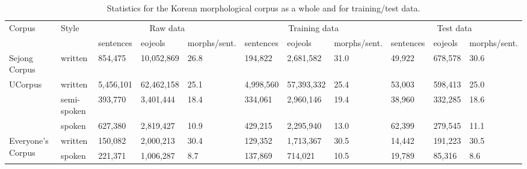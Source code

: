 \documentclass[AMS,STIX2COL]{WileyNJD-v2}
\begin{document}
    \begin{table}[ht]
        \centering
        \footnotesize
        \caption{Statistics for the Korean morphological corpus as a whole and for training/test data.}
        \label{tab:data-statistics}
        \begin{tabular}{m{20mm}m{14mm}m{10mm}m{12mm}m{10mm}m{10mm}m{12mm}m{10mm}m{10mm}m{12mm}m{10mm}}
            \toprule
            \multirow{2}{*}{Corpus}            & \multirow{2}{*}{Style} & \multicolumn{3}{c}{Raw data}                  & \multicolumn{3}{c}{Training data}             & \multicolumn{3}{c}{Test data}              \\
            \cmidrule(lr){3-5} \cmidrule(lr){6-8} \cmidrule(lr){9-11}
            ~                                  & ~                      & sentences & eojeols    & morphs\newline/sent. & sentences & eojeols    & morphs\newline/sent. & sentences & eojeols & morphs\newline/sent. \\
            \midrule
            Sejong Corpus                      & written                & 854,475   & 10,052,869 & 26.8                 & 194,822   & 2,681,582  & 31.0                 & 49,922    & 678,578 & 30.6                 \\
            \midrule
            \multirow{3}{*}{UCorpus}           & written                & 5,456,101 & 62,462,158 & 25.1                 & 4,998,560 & 57,393,332 & 25.4                 & 53,003    & 598,413 & 25.0                 \\
            ~                                  & semi-spoken            & 393,770   & 3,401,444  & 18.4                 & 334,061   & 2,960,146  & 19.4                 & 38,960    & 332,285 & 18.6                 \\
            ~                                  & spoken                 & 627,380   & 2,819,427  & 10.9                 & 429,215   & 2,295,940  & 13.0                 & 62,399    & 279,545 & 11.1                 \\
            \midrule
            \multirow{2}{*}{Everyone's Corpus} & written                & 150,082   & 2,000,213  & 30.4                 & 129,352   & 1,713,367  & 30.5                 & 14,442    & 191,223 & 30.5                 \\
            ~                                  & spoken                 & 221,371   & 1,006,287  & 8.7                  & 137,869   & 714,021    & 10.5                 & 19,789    & 85,316  & 8.6                  \\
            \bottomrule
        \end{tabular}
    \end{table}
\end{document}
